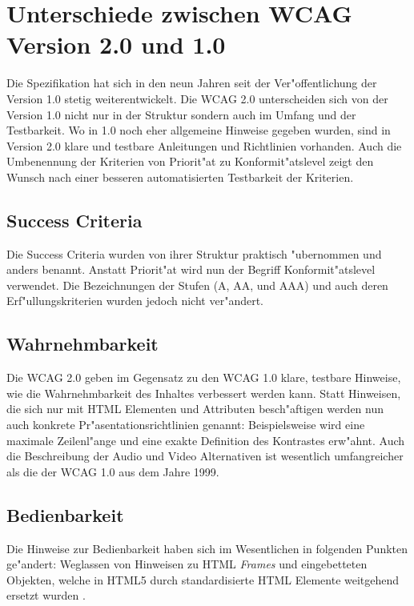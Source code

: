\documentclass[a4paper,bibtotoc,oneside]{scrbook}
\begin{document}
\section{Unterschiede zwischen WCAG Version 2.0 und 1.0}
Die Spezifikation hat sich in den neun Jahren seit der Ver"offentlichung der Version 1.0 stetig weiterentwickelt. Die WCAG 2.0 unterscheiden sich von der Version 1.0 nicht nur in der Struktur sondern auch im Umfang und der Testbarkeit. Wo in 1.0 noch eher allgemeine Hinweise gegeben wurden, sind in Version 2.0 klare und testbare Anleitungen und Richtlinien vorhanden. Auch die Umbenennung der Kriterien von Priorit"at zu Konformit"atslevel zeigt den Wunsch nach einer besseren automatisierten Testbarkeit der Kriterien. \cite[Abschnitt Introduction]{wcag2}

\subsection{Success Criteria}
Die Success Criteria wurden von ihrer Struktur praktisch "ubernommen und anders benannt. Anstatt Priorit"at wird nun der Begriff Konformit"atslevel verwendet. Die Bezeichnungen der Stufen (A, AA, und AAA) und auch deren Erf"ullungskriterien wurden jedoch nicht ver"andert.

\subsection{Wahrnehmbarkeit}
Die WCAG 2.0 geben im Gegensatz zu den WCAG 1.0 klare, testbare Hinweise, wie die Wahrnehmbarkeit des Inhaltes verbessert werden kann. Statt Hinweisen, die sich nur mit HTML Elementen und Attributen besch"aftigen werden nun auch konkrete Pr"asentationsrichtlinien genannt: Beispielsweise wird eine maximale Zeilenl"ange und eine exakte Definition des Kontrastes erw"ahnt. Auch die Beschreibung der Audio und Video Alternativen ist wesentlich umfangreicher als die der WCAG 1.0 aus dem Jahre 1999.

\subsection{Bedienbarkeit}
Die Hinweise zur Bedienbarkeit haben sich im Wesentlichen in folgenden Punkten ge"andert: Weglassen von Hinweisen zu HTML \emph{Frames} und eingebetteten Objekten, welche in HTML5 durch standardisierte HTML Elemente weitgehend ersetzt wurden \cite [Abschnitt audio und video element]{html5}.
\end{document}
